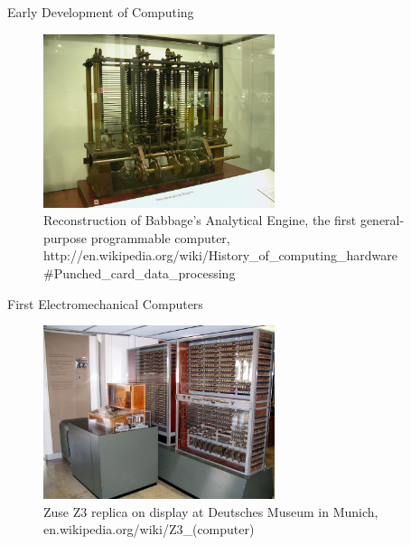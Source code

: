 \documentclass[xcolor=x11names,compress]{beamer}
\renewcommand{\(}{\begin{columns}}
\renewcommand{\)}{\end{columns}}
\newcommand{\<}[1]{\begin{column}{#1}}
\renewcommand{\>}{\end{column}}
\begin{document}
\begin{frame}{Early Development of Computing}

\begin{figure}
\includegraphics[height=2in,clip]{BabbageDiffMachine}
\caption{Reconstruction of Babbage's Analytical Engine, the first general-purpose programmable computer, http://en.wikipedia.org/wiki/History\_of\_computing\_hardware
\#Punched\_card\_data\_processing}
\end{figure}

\end{frame}

\begin{frame}{First Electromechanical Computers}

\begin{figure}
\includegraphics[height=2in,clip]{Z3DeutschesMuseum}
\caption{Zuse Z3 replica on display at Deutsches Museum in Munich, en.wikipedia.org/wiki/Z3\_(computer)}
\end{figure}

\end{frame}
\end{document}
